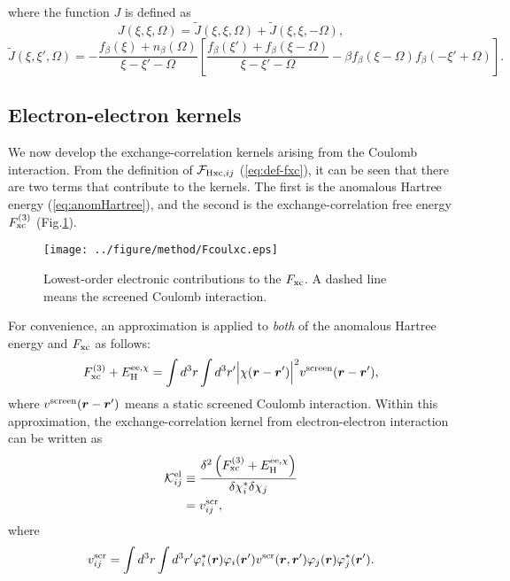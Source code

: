 %
where the function $J$ is defined as
%
\begin{equation}
	J(\xi, \xi, \Omega) = \tilde{J}(\xi, \xi, \Omega) + \tilde{J}(\xi, \xi, -\Omega), 
	\label{eq:Jfunc}
\end{equation}
%
\begin{equation}
	\tilde{J}(\xi, \xi', \Omega) = 
	- \frac{f_\beta(\xi) + n_\beta(\Omega)}{\xi-\xi'-\Omega}
	\left[
		\frac{f_\beta(\xi') + f_\beta(\xi-\Omega)}{\xi-\xi'-\Omega} -
		\beta f_\beta(\xi-\Omega) f_\beta(-\xi'+\Omega)
	\right].
	\label{eq:Jtildefunc}
\end{equation}
%
%
\subsection*{Electron-electron kernels}
%
We now develop the exchange-correlation kernels arising from the Coulomb interaction.
From the definition of ${\mathcal F}_{{\rm Hxc},ij}$ (\ref{eq:def-fxc}), it can be seen that
there are two terms that contribute to the kernels. The first is the anomalous Hartree energy (\ref{eq:anomHartree}), 
and the second is the exchange-correlation free energy $F^{(3)}_{\rm xc}$ (Fig.\ref{fig:Fcoulxc}).
%
\begin{figure} %
	\centering
	\texttt{[image: ../figure/method/Fcoulxc.eps]}
	\caption{Lowest-order electronic contributions to the $F_{\rm xc}$. A dashed line means the screened Coulomb interaction.}
	\label{fig:Fcoulxc}
\end{figure}
%
For convenience, an approximation is applied to {\it both} of the anomalous Hartree energy and $F_{\rm xc}$ 
as follows\cite{Luders2005_1}:
%
\begin{equation}
	F^{(3)}_{\rm xc} + E^{{\rm ee}, \chi}_{\rm H} = \int d^3r \int d^3r'
	\Big| \chi(\bm r - \bm r') \Big|^2 v^{\rm screen}(\bm r - \bm r'),
	\label{Fcoulxcapprox}
\end{equation}
%
where $v^{\rm screen}(\bm r - \bm r')$ means a static screened Coulomb interaction.
Within this approximation, the exchange-correlation kernel from electron-electron interaction
can be written as
%
\begin{equation}
	\label{eq:Kel}
\begin{split}
	{\mathcal K}^{\rm el}_{ij} &\equiv \frac{\delta^2 \left( F^{(3)}_{\rm xc} + E^{{\rm ee},\chi}_{\rm H} \right)}
	{\delta \chi^\ast_i \delta\chi_j} \\
	& = v^{\rm scr}_{ij},
\end{split}
\end{equation}
%
where
%
\begin{equation}
	v^{\rm scr}_{ij} = \int d^3r \int d^3r' \varphi^\ast_i(\bm r)\varphi_i({\bm r'})
	v^{\rm scr}(\bm r, {\bm r'}) \varphi_j(\bm r) \varphi^\ast_j({\bm r'}).
	\label{eq:Keldef}
\end{equation}
%

